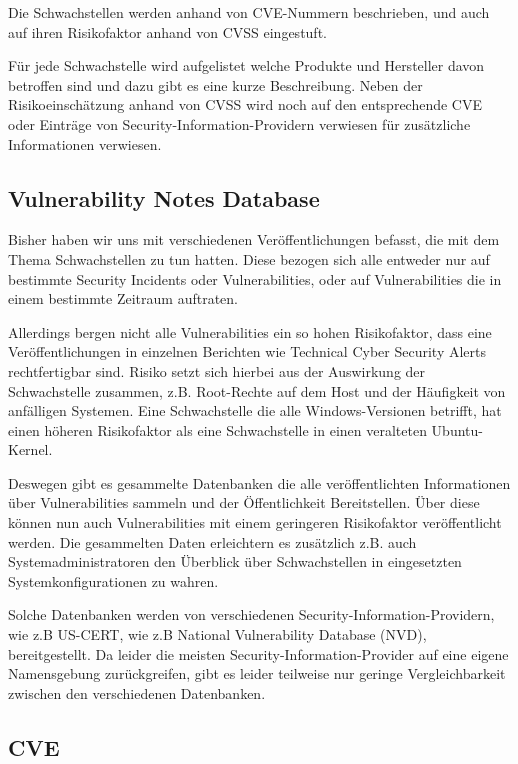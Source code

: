 Die Schwachstellen werden anhand von CVE-Nummern beschrieben, und auch
auf ihren Risikofaktor anhand von CVSS eingestuft.

Für jede Schwachstelle wird aufgelistet welche Produkte und Hersteller
davon betroffen sind und dazu gibt es eine kurze Beschreibung. Neben
der Risikoeinschätzung anhand von CVSS wird noch auf den entsprechende
CVE oder Einträge von Security-Information-Providern verwiesen für
zusätzliche Informationen verwiesen.

\subsection{Vulnerability Notes Database}

Bisher haben wir uns mit verschiedenen Veröffentlichungen befasst, die
mit dem Thema Schwachstellen zu tun hatten. Diese bezogen sich alle
entweder nur auf bestimmte Security Incidents oder Vulnerabilities,
oder auf Vulnerabilities die in einem bestimmte Zeitraum auftraten.

Allerdings bergen nicht alle Vulnerabilities ein so hohen
Risikofaktor, dass eine Veröffentlichungen in einzelnen Berichten wie
Technical Cyber Security Alerts rechtfertigbar sind.  Risiko setzt
sich hierbei aus der Auswirkung der Schwachstelle zusammen,
z.B. Root-Rechte auf dem Host und der Häufigkeit von anfälligen
Systemen. Eine Schwachstelle die alle Windows-Versionen betrifft, hat
einen höheren Risikofaktor als eine Schwachstelle in einen veralteten
Ubuntu-Kernel.

Deswegen gibt es gesammelte Datenbanken die alle veröffentlichten
Informationen über Vulnerabilities sammeln und der Öffentlichkeit
Bereitstellen. Über diese können nun auch Vulnerabilities mit einem
geringeren Risikofaktor veröffentlicht werden.  Die gesammelten Daten
erleichtern es zusätzlich z.B. auch Systemadministratoren den
Überblick über Schwachstellen in eingesetzten Systemkonfigurationen zu
wahren.

Solche Datenbanken werden von verschiedenen
Security-Information-Providern, wie z.B US-CERT, wie z.B National
Vulnerability Database (NVD), bereitgestellt. Da leider die meisten
Security-Information-Provider auf eine eigene Namensgebung
zurückgreifen, gibt es leider teilweise nur geringe Vergleichbarkeit
zwischen den verschiedenen Datenbanken.

\subsection{CVE}
